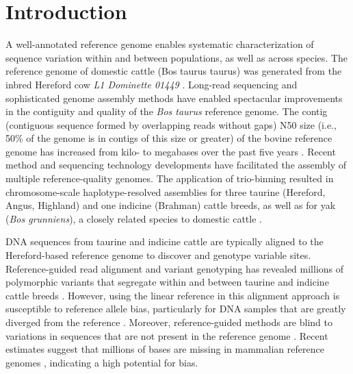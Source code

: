 \documentclass[../main.tex]{subfiles}
\begin{document}
\section{Introduction}
 
\normalsize

A well-annotated reference genome enables systematic characterization of sequence variation within and between populations, as well as across species. The reference genome of domestic cattle (Bos taurus taurus) was generated from the inbred Hereford cow \emph{L1 Dominette 01449} \citep{sequencing2009genome}. Long-read sequencing and sophisticated genome assembly methods have enabled spectacular improvements in the contiguity and quality of the \emph{Bos taurus} reference genome. The contig (contiguous sequence formed by overlapping reads without gaps) N50 size (i.e., 50\% of the genome is in contigs of this size or greater) of the bovine reference genome has increased from kilo- to megabases over the past five years \citep{rosen2020novo}. Recent method and sequencing technology developments have facilitated the assembly of multiple reference-quality genomes. The application of trio-binning \citep{koren2018novo} resulted in chromosome-scale haplotype-resolved assemblies for three taurine (Hereford, Angus, Highland) and one indicine (Brahman) cattle breeds, as well as for yak (\emph{Bos grunniens}), a closely related species to domestic cattle \citep{low2020haplotype,rice2020continuous}.

DNA sequences from taurine and indicine cattle are typically aligned to the Hereford-based reference genome to discover and genotype variable sites. Reference-guided read alignment and variant genotyping has revealed millions of polymorphic variants that segregate within and between taurine and indicine cattle breeds \citep{kim2020mosaic,daetwyler2014whole,koufariotis2018sequencing}. However, using the linear reference in this alignment approach is susceptible to reference allele bias, particularly for DNA samples that are greatly diverged from the reference \citep{ballouz2019time,pritt2018forge}. Moreover, reference-guided methods are blind to variations in sequences that are not present in the reference genome \citep{wong2020towards}. Recent estimates suggest that millions of bases are missing in mammalian reference genomes \citep{sherman2019assembly,whitacre2015s}, indicating a high potential for bias.
\end{document}
